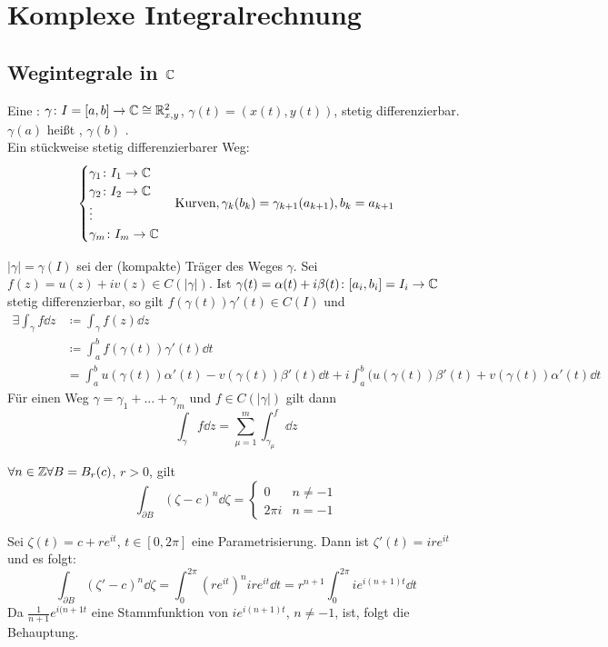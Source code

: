 \chapter{Komplexe Integralrechnung}
\section{Wegintegrale in $ \mathbb{C} $}
Eine : $ \gamma\colon I=[a,b]\rightarrow\mathbb{C}\cong\mathbb{R}^2_{x,y} $, $ \gamma(t)=(x(t),y(t)) $, stetig differenzierbar.\\
$ \gamma(a) $ hei\ss t , $ \gamma(b) $ .\\
Ein st\"uckweise stetig differenzierbarer Weg:
\[ \begin{cases}
\gamma_1\colon I_1\rightarrow\mathbb{C}\\\gamma_2\colon I_2\rightarrow\mathbb{C}\\\vdots\\\gamma_m\colon I_m\rightarrow\mathbb{C}
\end{cases}\text{Kurven}, \gamma_k(b_k)=\gamma_{k+1}(a_{k+1}), b_k=a_{k+1} \]
\begin{satz}
	$ |\gamma|=\gamma(I) $ sei der (kompakte) Tr\"ager des Weges $ \gamma $. Sei $ f(z)=u(z)+iv(z)\in C(|\gamma|) $. Ist $ \gamma(t)=\alpha(t)+i\beta(t)\colon[a_i,b_i]=I_i\rightarrow\mathbb{C} $ stetig differenzierbar, so gilt $ f(\gamma(t))\gamma'(t)\in C(I) $ und
	\begin{align*} \exists\int_{\gamma}^{}f\dd z&\coloneqq\int_{\gamma}^{}f(z)\dd z\\&\coloneqq\int_a^b f(\gamma(t))\gamma'(t)\dd t\\&=\int_a^b u(\gamma(t))\alpha'(t)-v(\gamma(t))\beta'(t)\dd t+i\int_a^b (u(\gamma(t))\beta'(t)+v(\gamma(t))\alpha'(t)\dd t \end{align*}
	F\"ur einen Weg $ \gamma=\gamma_1+...+\gamma_m $ und $ f\in C(|\gamma|) $ gilt dann
	\[ \int_{\gamma}^{}f\dd z=\sum_{\mu=1}^{m}\int_{\gamma_\mu}^{f}\dd z \]
\end{satz}
\begin{satz}
	$ \forall n\in\mathbb{Z}\forall B=B_r(c) $, $ r>0 $, gilt
	\[ \int_{\partial B}^{}(\zeta-c)^n\dd\zeta= \begin{cases}
	0&n\neq-1\\2\pi i&n=-1
	\end{cases} \]
\end{satz}
\begin{beweis}
	Sei $ \zeta(t)=c+re^{it} $, $ t\in[0,2\pi] $ eine Parametrisierung. Dann ist $ \zeta'(t)=ire^{it} $ und es folgt:
	\[ \int_{\partial B}^{}(\zeta'-c)^n\dd\zeta=\int_0^{2\pi}(re^{it})^n ire^{it}\dd t=r^{n+1}\int_0^{2\pi}ie^{i(n+1)t}\dd t \]
	Da $ \frac{1}{n+1}e^{i(n+1t} $ eine Stammfunktion von $ ie^{i(n+1)t} $, $ n\neq -1 $, ist, folgt die Behauptung.
\end{beweis}
